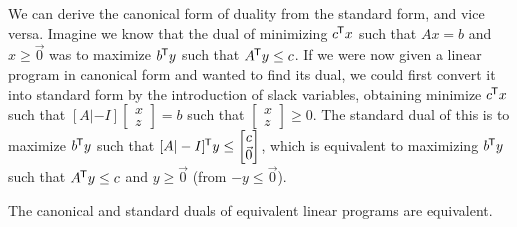 \begin{rmk}
    We can derive the canonical form of duality from the standard form, and vice versa. Imagine we know that the dual of minimizing $c^{\mkern-1.5mu\mathsf{T}}x$ such that $Ax = b$ and $x \geq \vec{0}$ was to maximize $b^{\mkern-1.5mu\mathsf{T}}y$ such that $A^{\mkern-1.5mu\mathsf{T}}y \leq c$. If we were now given a linear program in canonical form and wanted to find its dual, we could first convert it into standard form by the introduction of slack variables, obtaining minimize $c^{\mkern-1.5mu\mathsf{T}}x$ such that $[A|-I]\begin{bmatrix}x \\ z\end{bmatrix} = b$ such that $\begin{bmatrix}x \\ z\end{bmatrix} \geq 0$. The standard dual of this is to maximize $b^{\mkern-1.5mu\mathsf{T}}y$ such that $[A|-I]^{\mkern-1.5mu\mathsf{T}}y \leq \begin{bmatrix}c \\ \vec{0}\end{bmatrix}$, which is equivalent to maximizing $b^{\mkern-1.5mu\mathsf{T}}y$ such that $A^{\mkern-1.5mu\mathsf{T}}y \leq c$ and $y \geq \vec{0}$ (from $-y \leq \vec{0}$).
\end{rmk}

\begin{prop}
    The canonical and standard duals of equivalent linear programs are equivalent.
\end{prop}

